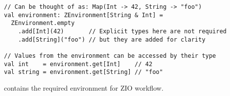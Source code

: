 \begin{algorithm}

\begin{verbatim}
// Can be thought of as: Map(Int -> 42, String -> "foo")
val environment: ZEnvironment[String & Int] =
  ZEnvironment.empty
    .add[Int](42)       // Explicit types here are not required
    .add[String]("foo") // but they are added for clarity

// Values from the environment can be accessed by their type
val int    = environment.get[Int]    // 42
val string = environment.get[String] // "foo"
\end{verbatim}

\caption{ contains the required environment for ZIO workflow. \label{zio:zenvironment}}
\end{algorithm}